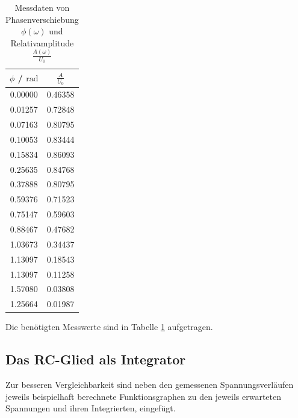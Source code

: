 \begin{table}
	\caption{Messdaten von Phasenverschiebung $\phi(\omega)$ und Relativamplitude $\frac{A(\omega)}{U_0}$}
	\centering
	\label{tab:polars}
	\begin{tabular}{cc}
		\toprule
		$\phi$ / $\si{\radian}$ & $\frac{A}{U_0}$ \\
		\midrule
		0.00000                 & 0.46358         \\
		0.01257                 & 0.72848         \\
		0.07163                 & 0.80795         \\
		0.10053                 & 0.83444         \\
		0.15834                 & 0.86093         \\
		0.25635                 & 0.84768         \\
		0.37888                 & 0.80795         \\
		0.59376                 & 0.71523         \\
		0.75147                 & 0.59603         \\
		0.88467                 & 0.47682         \\
		1.03673                 & 0.34437         \\
		1.13097                 & 0.18543         \\
		1.13097                 & 0.11258         \\
		1.57080                 & 0.03808         \\
		1.25664                 & 0.01987         \\
		\bottomrule
	\end{tabular}
\end{table}

Die benötigten Messwerte sind in Tabelle \ref{tab:polars} aufgetragen.
\subsection{Das RC-Glied als Integrator}
Zur besseren Vergleichbarkeit sind neben den gemessenen Spannungsverläufen jeweils beispielhaft berechnete Funktionsgraphen zu den jeweils erwarteten Spannungen und ihren Integrierten, eingefügt.


